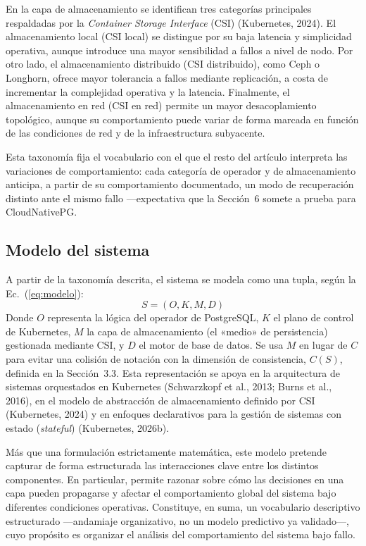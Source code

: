 \documentclass[12pt,twocolumn,letterpaper]{article}
\newcommand{\Ec}[1]{Ec.~(\ref{#1})}
\begin{document}
En la capa de almacenamiento se identifican tres categorías principales respaldadas por la \textit{Container Storage Interface} (CSI) (Kubernetes, 2024). El almacenamiento local (CSI local) se distingue por su baja latencia y simplicidad operativa, aunque introduce una mayor sensibilidad a fallos a nivel de nodo. Por otro lado, el almacenamiento distribuido (CSI distribuido), como Ceph o Longhorn, ofrece mayor tolerancia a fallos mediante replicación, a costa de incrementar la complejidad operativa y la latencia. Finalmente, el almacenamiento en red (CSI en red) permite un mayor desacoplamiento topológico, aunque su comportamiento puede variar de forma marcada en función de las condiciones de red y de la infraestructura subyacente.

Esta taxonomía fija el vocabulario con el que el resto del artículo interpreta las variaciones de comportamiento: cada categoría de operador y de almacenamiento anticipa, a partir de su comportamiento documentado, un modo de recuperación distinto ante el mismo fallo —expectativa que la Sección~6 somete a prueba para CloudNativePG.

\subsection{Modelo del sistema}
A partir de la taxonomía descrita, el sistema se modela como una tupla, según la \Ec{eq:modelo}:
\begin{equation}\label{eq:modelo}
S = (O, K, M, D)
\end{equation}
Donde $O$ representa la lógica del operador de PostgreSQL, $K$ el plano de control de Kubernetes, $M$ la capa de almacenamiento (el «medio» de persistencia) gestionada mediante CSI, y $D$ el motor de base de datos. Se usa $M$ en lugar de $C$ para evitar una colisión de notación con la dimensión de consistencia, $C(S)$, definida en la Sección~3.3. Esta representación se apoya en la arquitectura de sistemas orquestados en Kubernetes (Schwarzkopf et al., 2013; Burns et al., 2016), en el modelo de abstracción de almacenamiento definido por CSI (Kubernetes, 2024) y en enfoques declarativos para la gestión de sistemas con estado (\textit{stateful}) (Kubernetes, 2026b).

Más que una formulación estrictamente matemática, este modelo pretende capturar de forma estructurada las interacciones clave entre los distintos componentes. En particular, permite razonar sobre cómo las decisiones en una capa pueden propagarse y afectar el comportamiento global del sistema bajo diferentes condiciones operativas. Constituye, en suma, un vocabulario descriptivo estructurado —andamiaje organizativo, no un modelo predictivo ya validado—, cuyo propósito es organizar el análisis del comportamiento del sistema bajo fallo.
\end{document}
